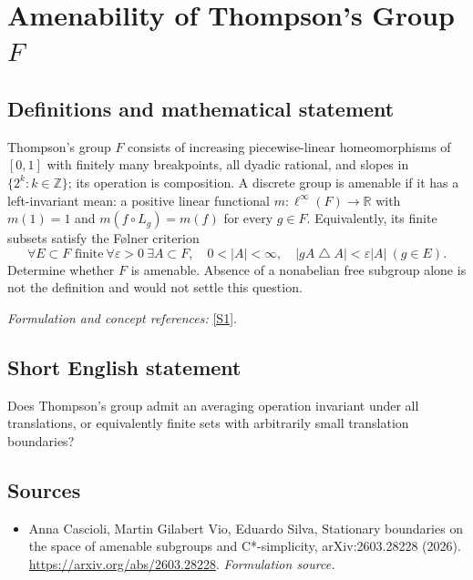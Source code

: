 \documentclass[11pt]{article}
\begin{document}
\section*{\texorpdfstring{Amenability of Thompson's Group $F$}{Amenability of Thompson's Group \$F\$}}\label{30001681}
\subsection{Definitions and mathematical statement}
Thompson's group $F$ consists of increasing piecewise-linear homeomorphisms of $[0,1]$ with finitely many breakpoints, all dyadic rational, and slopes in $\{2^k:k\in{\mathbb{Z}}\}$; its operation is composition. A discrete group is amenable if it has a left-invariant mean: a positive linear functional $m:\ell^\infty(F)\to{\mathbb{R}}$ with $m(1)=1$ and $m(f\circ L_g)=m(f)$ for every $g\in F$. Equivalently, its finite subsets satisfy the F\o lner criterion
\[
 \forall E\subset F\text{ finite}\ \forall{\varepsilon}>0\ \exists A\subset F,
 \quad0<|A|<\infty,\quad |gA\mathbin{\triangle} A|<{\varepsilon}|A|\ (g\in E).
\]
Determine whether $F$ is amenable. Absence of a nonabelian free subgroup alone is not the definition and would not settle this question.
\par\smallskip\textit{Formulation and concept references:} \href{https://arxiv.org/abs/2603.28228}{[S1]}.

\subsection{Short English statement}
Does Thompson's group admit an averaging operation invariant under all translations, or equivalently finite sets with arbitrarily small translation boundaries?
\subsection{Sources}
\begin{itemize}
\item[S1]Anna Cascioli, Martin Gilabert Vio, Eduardo Silva, Stationary boundaries on the space of amenable subgroups and C*-simplicity, arXiv:2603.28228 (2026).
\url{https://arxiv.org/abs/2603.28228}.
\textit{Formulation source.}
\end{itemize}
\end{document}
